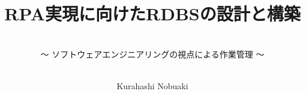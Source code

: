 
\titlehead{\hfill\small\customdate}

\subject{\Large--- 事務的な定常業務の自動化 ---}

\title{\huge RPA実現に向けたRDBSの設計と構築}

\subtitle{\ \\\normalsize～ ソフトウェアエンジニアリングの視点による作業管理 ～}

\date{}

\publishers{}

\author{\ \\\small Kurahashi Nobuaki}

\uppertitleback{\small
This document was created using \TeX{} (\linkLaTeX\kern.15em2$_{\textstyle\varepsilon}$), specifically utilizing tools such as \linkTeXLive{} 2023, up\LaTeX, \linkBibLaTeX\ (\linkBiber), \linkPGFTikZ, and many useful packages, and \linkTeXStudio.\\
Numerical calculations were performed using \linkExcel{} and \linkPython.\\
The source codes for the G-code programs were written using \linkVSCode.\\
Version control for these documents was managed using \linkGitHub.\\
The environment for these tools was managed using \linkDocker{} and \linkUbuntu.\\
The database used was \linkSQLite.\\
Thanks to these tools, with the all-around support of  (\linkMicrosoftCopilot), the creation of this document and system was made possible.
}

